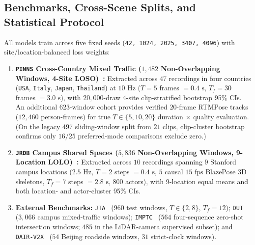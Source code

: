 \documentclass[journal]{IEEEtran}
\begin{document}
\subsection{Benchmarks, Cross-Scene Splits, and Statistical Protocol}
All models train across five fixed seeds (\texttt{42, 1024, 2025, 3407, 4096}) with site/location-balanced loss weights:
\begin{enumerate}
  \item \textbf{\texttt{PINNS} Cross-Country Mixed Traffic ($1{,}482$ Non-Overlapping Windows, 4-Site LOSO)~\cite{peng2026pinns}:} Extracted across $47$ recordings in four countries (\texttt{USA}, \texttt{Italy}, \texttt{Japan}, \texttt{Thailand}) at $10\text{ Hz}$ ($T = 5$ frames $= 0.4\text{ s}$, $T_f = 30$ frames $= 3.0\text{ s}$), with $20{,}000$-draw 4-site clip-stratified bootstrap 95\% CIs. An additional $623$-window cohort provides verified $20$-frame RTMPose tracks ($12{,}460$ person-frames) for true $T \in \{5, 10, 20\}$ duration $\times$ quality evaluation. (On the legacy $497$ sliding-window split from $21$ clips, clip-cluster bootstrap confirms only $16 / 25$ preferred-mode comparisons exclude zero.)
  \item \textbf{\texttt{JRDB} Campus Shared Spaces ($5{,}836$ Non-Overlapping Windows, 9-Location LOLO)~\cite{martin2023jrdb}:} Extracted across $10$ recordings spanning $9$ Stanford campus locations ($2.5\text{ Hz}$, $T = 2$ steps $= 0.4\text{ s}$, $5$ causal $15\text{ fps}$ BlazePose 3D skeletons, $T_f = 7$ steps $= 2.8\text{ s}$, $800$ actors), with 9-location equal means and both location- and actor-cluster 95\% CIs.
  \item \textbf{External Benchmarks:} \texttt{JTA}~\cite{fabbri2018jta} ($960$ test windows, $T \in \{2, 8\}$, $T_f = 12$); \texttt{DUT}~\cite{yang2019dut} ($3{,}066$ campus mixed-traffic windows); \texttt{IMPTC}~\cite{hetzel2023imptc} ($564$ four-sequence zero-shot intersection windows; $485$ in the LiDAR-camera supervised subset); and \texttt{DAIR-V2X}~\cite{yu2022dair} ($54$ Beijing roadside windows, $31$ strict-clock windows).
\end{enumerate}
\end{document}

